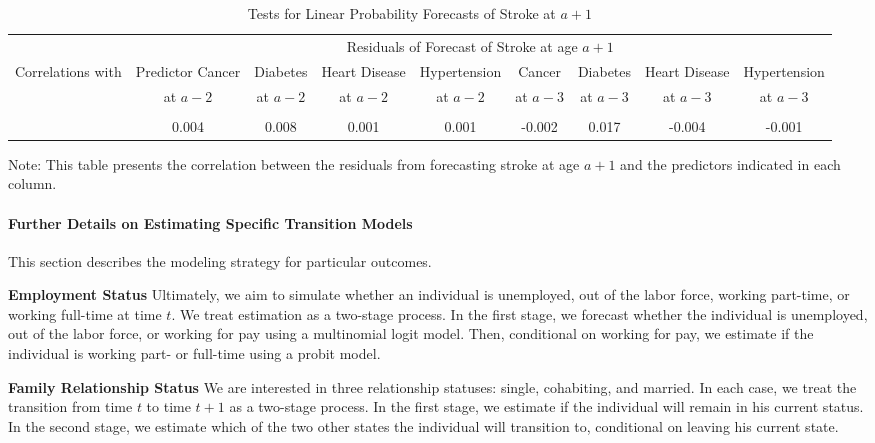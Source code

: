 \begin{landscape}
\begin{table}[H]
\begin{threeparttable}
\caption{Tests for Linear Probability Forecasts of Stroke at $a+1$} \label{table:1storderresidstroke}
\centering
\footnotesize
\begin{tabular}{l *{8}{c}}
\toprule
& \multicolumn{8}{c}{Residuals of Forecast of Stroke at age $a+1$} \\
Correlations with	&	Predictor Cancer &	Diabetes & Heart Disease &	Hypertension &	Cancer	& Diabetes & Heart Disease & Hypertension  \\
                    &	at $a-2$	&	at $a - 2$ & at $a - 2$	& at $a - 2$	& at $a-3$	& at $a - 3$	& at $a - 3$	& at $a - 3$ \\
\midrule \\
&	0.004 &	0.008	&	0.001	&	0.001	&	-0.002	&	0.017 &	-0.004 &	-0.001	\\
\bottomrule
\end{tabular}
\begin{tablenotes}
\footnotesize
\item Note: This table presents the correlation between the residuals from forecasting stroke at age $a+1$ and the predictors indicated in each column.
\end{tablenotes}
\end{threeparttable}
\end{table}

\end{landscape}

\paragraph{Further Details on Estimating Specific Transition Models}
\noindent This section describes the modeling strategy for particular outcomes.

\noindent \textbf{Employment Status}
\noindent Ultimately, we aim to simulate whether an individual is unemployed, out of the labor force, working part-time, or working full-time at
time $t$. We treat estimation as a two-stage process. In the first stage, we forecast whether the individual is unemployed, out of
the labor force, or working for pay using a multinomial logit model. Then, conditional on working for pay, we estimate if
the individual is working part- or full-time using a probit model.

\noindent \textbf{Family Relationship Status}
\noindent We are interested in three relationship statuses: single, cohabiting, and married. In each case, we treat the transition
from time $t$ to time $t+1$ as a two-stage process. In the first stage, we estimate if the individual will remain in his
current status. In the second stage, we estimate which of the two other states the individual will transition to, conditional
on leaving his current state.


